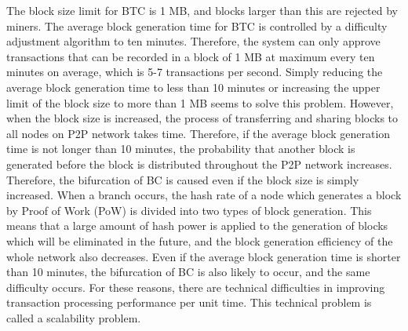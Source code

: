 \documentclass[graybox]{svmult}
\begin{document}
The block size limit for BTC is 1 MB, and blocks larger than this are rejected by miners. 
The average block generation time for BTC is controlled by a difficulty adjustment algorithm to ten minutes. 
Therefore, the system can only approve transactions that can be recorded in a block of 1 MB at maximum every ten minutes on average, which is 5-7 transactions per second. 
Simply reducing the average block generation time to less than 10 minutes or increasing the upper limit of the block size to more than 1 MB seems to solve this problem.
However, when the block size is increased, the process of transferring and sharing blocks to all nodes on P2P network takes time.
Therefore, if the average block generation time is not longer than 10 minutes, the probability that another block is generated before the block is distributed throughout the P2P network increases.
Therefore, the bifurcation of BC is caused even if the block size is simply increased.
When a branch occurs, the hash rate of a node which generates a block by Proof of Work (PoW) is divided into two types of block generation.
This means that a large amount of hash power is applied to the generation of blocks which will be eliminated in the future, and the block generation efficiency of the whole network also decreases.
Even if the average block generation time is shorter than 10 minutes, the bifurcation of BC is also likely to occur, and the same difficulty occurs.
For these reasons, there are technical difficulties in improving transaction processing performance per unit time.
This technical problem is called a scalability problem.
\end{document}
